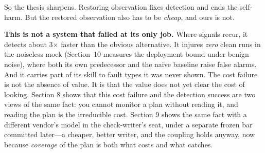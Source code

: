\documentclass[acmsmall,screen]{acmart}
\begin{document}
So the thesis sharpens. Restoring observation fixes detection and ends the
self-harm. But the restored observation also has to be \emph{cheap}, and ours
is not.

\textbf{This is not a system that failed at its only job.} Where signals
recur, it detects about 3$\times$ faster than the obvious alternative. It
injures \emph{zero} clean runs in the noiseless mock (Section~10 measures the deployment
bound under benign noise), where both its own predecessor and the naive
baseline raise false alarms. And it carries part of its skill to fault types it
was never shown. The cost failure is not the absence of value. It is that the
value does not yet clear the cost of looking. Section 8 shows that this cost
failure and the detection success are two views of the same fact: you cannot
monitor a plan without reading it, and reading the plan is the irreducible cost.
Section 9 shows the same fact with a different vendor's model in the
check-writer's seat, under a separate frozen bar committed later---a cheaper,
better writer, and the coupling holds anyway, now because \emph{coverage} of the
plan is both what costs and what catches.
\end{document}
